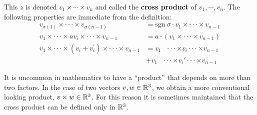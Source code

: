 This $z$ is denoted $v_1\times\cdots\times v_n$ and called the \textbf{cross product} of 
$v_1, \cdots, v_n$. The following properties are immediate from the definition:
\begin{align*}
    v_{\sigma(1)}\times\cdot\cdot\cdot\times v_{\sigma(n-1)} 
        & = \mathrm{sgn~}\sigma\cdot v_1\times\cdot\cdot\cdot\times v_{n-1} \\
    v_1\times\cdot\cdot\cdot\times av_i\times\cdot\cdot\cdot\times v_{n-1}
        & = a\cdot(v_1\times\cdot\cdot\cdot\times v_{n-1}) \\
    v_1\times\cdot\cdot\cdot\times(v_i+v_i^\prime)\times\cdot\cdot\cdot\times v_{n-1}
        & = v_1\text{  }\cdot\cdot\cdot\times v_i \cdot\cdot\cdot\times v_{n-1} \\
        & + v_1\text{  }\cdot\cdot\cdot\times v_i' \cdot\cdot\cdot\times v_{n-1}
\end{align*}

It is uncommon in mathematics to have a ``product'' that
depends on more than two factors.
In the case of two vectors $v,w\in\mathbb{R}^3$, we obtain a more conventional looking product,
$v\times w \in \mathbb{R}^3$. For this reason it is sometimes maintained
that the cross product can be defined only in $\mathbb{R}^3$.


